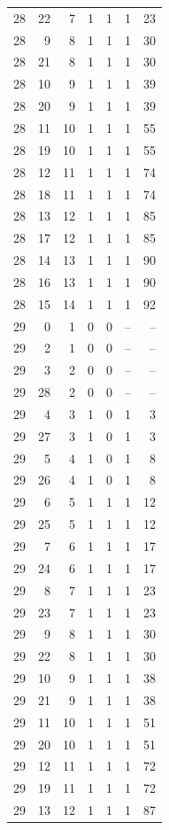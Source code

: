 \begin{longtable}{rrrrrrr}
28 & 22 & 7 & 1 & 1 & 1 & 23\\
28 & 9 & 8 & 1 & 1 & 1 & 30\\
28 & 21 & 8 & 1 & 1 & 1 & 30\\
28 & 10 & 9 & 1 & 1 & 1 & 39\\
28 & 20 & 9 & 1 & 1 & 1 & 39\\
28 & 11 & 10 & 1 & 1 & 1 & 55\\
28 & 19 & 10 & 1 & 1 & 1 & 55\\
28 & 12 & 11 & 1 & 1 & 1 & 74\\
28 & 18 & 11 & 1 & 1 & 1 & 74\\
28 & 13 & 12 & 1 & 1 & 1 & 85\\
28 & 17 & 12 & 1 & 1 & 1 & 85\\
28 & 14 & 13 & 1 & 1 & 1 & 90\\
28 & 16 & 13 & 1 & 1 & 1 & 90\\
28 & 15 & 14 & 1 & 1 & 1 & 92\\
29 & 0 & 1 & 0 & 0 & -- & --\\
29 & 2 & 1 & 0 & 0 & -- & --\\
29 & 3 & 2 & 0 & 0 & -- & --\\
29 & 28 & 2 & 0 & 0 & -- & --\\
29 & 4 & 3 & 1 & 0 & 1 & 3\\
29 & 27 & 3 & 1 & 0 & 1 & 3\\
29 & 5 & 4 & 1 & 0 & 1 & 8\\
29 & 26 & 4 & 1 & 0 & 1 & 8\\
29 & 6 & 5 & 1 & 1 & 1 & 12\\
29 & 25 & 5 & 1 & 1 & 1 & 12\\
29 & 7 & 6 & 1 & 1 & 1 & 17\\
29 & 24 & 6 & 1 & 1 & 1 & 17\\
29 & 8 & 7 & 1 & 1 & 1 & 23\\
29 & 23 & 7 & 1 & 1 & 1 & 23\\
29 & 9 & 8 & 1 & 1 & 1 & 30\\
29 & 22 & 8 & 1 & 1 & 1 & 30\\
29 & 10 & 9 & 1 & 1 & 1 & 38\\
29 & 21 & 9 & 1 & 1 & 1 & 38\\
29 & 11 & 10 & 1 & 1 & 1 & 51\\
29 & 20 & 10 & 1 & 1 & 1 & 51\\
29 & 12 & 11 & 1 & 1 & 1 & 72\\
29 & 19 & 11 & 1 & 1 & 1 & 72\\
29 & 13 & 12 & 1 & 1 & 1 & 87\\

\end{longtable}
